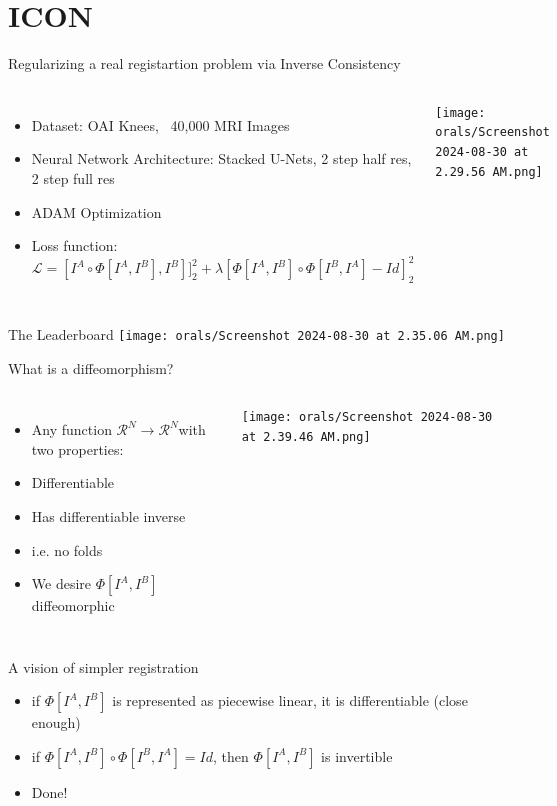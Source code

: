 \documentclass{beamer}
\begin{document}
\section{ICON}
\begin{frame}{Regularizing a real registartion problem via Inverse Consistency}
	\begin{columns}
        \begin{itemize}
            \item Dataset: OAI Knees, ~40,000 MRI Images
		   \item Neural Network Architecture: Stacked U-Nets, 2 step half res, 2 step full res
		   \item ADAM Optimization
		   \item Loss function: $\mathcal{L} = [I^A \circ \Phi[I^A, I^B], I^B]]^2_2 + \lambda [\Phi[I^A, I^B] \circ \Phi[I^B, I^A] - Id ]^2_2$
        \end{itemize}
		\texttt{[image: orals/Screenshot 2024-08-30 at 2.29.56 AM.png]}
	\end{columns}
\end{frame}

\begin{frame}{The Leaderboard}
	\texttt{[image: orals/Screenshot 2024-08-30 at 2.35.06 AM.png]}
\end{frame}

\begin{frame}{What is a diffeomorphism?}
	\begin{columns}
		\column{.5\textwidth}
	\begin{itemize}
		\item Any function $\mathcal{R}^N \rightarrow \mathcal{R}^N $with two properties:
		\item Differentiable
		\item Has differentiable inverse
		\item i.e. no folds
		\item We desire $\Phi[I^A, I^B]$ diffeomorphic

	\end{itemize}
	
		\column{.5\textwidth}

		\texttt{[image: orals/Screenshot 2024-08-30 at 2.39.46 AM.png]}
	\end{columns}
\end{frame}

\begin{frame}{A vision of simpler registration}
	\begin{itemize}
		\item if $\Phi[I^A, I^B]$ is represented as piecewise linear, it is differentiable (close enough)
		\item if $\Phi[I^A, I^B] \circ \Phi[I^B, I^A] = Id$, then $\Phi[I^A, I^B]$ is invertible
		\item Done!
	\end{itemize}
\end{frame}
\end{document}
